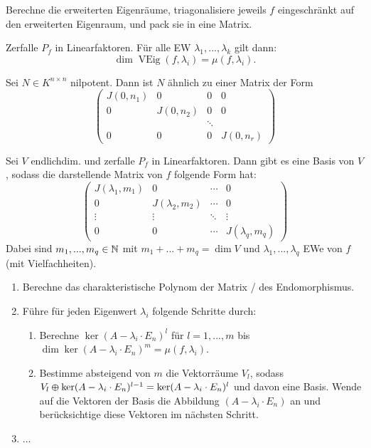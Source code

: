 \documentclass{cheat-sheet}
\DeclareMathOperator{\VEig}{VEig}
\begin{document}
\begin{verf}
  Berechne die erweiterten Eigenräume, triagonalisiere jeweils $f$ eingeschränkt auf den erweiterten Eigenraum, und pack sie in eine Matrix.
\end{verf}

\begin{satz}
  Zerfalle $P_f$ in Linearfaktoren. Für alle EW $\lambda_1, ..., \lambda_k$ gilt dann:
  \[ \dim \VEig(f, \lambda_i) = \mu(f, \lambda_i). \]
\end{satz}

\begin{satz}
  Sei $N \in K^{n \times n}$ nilpotent. Dann ist $N$ ähnlich zu einer Matrix der Form
  \[ \begin{pmatrix}
  J(0, n_1) & 0 & 0 & 0 \\
  0 & J(0, n_2) & 0 & 0 \\
  & & \ddots & \\
  0 & 0 & 0 & J(0, n_r)
  \end{pmatrix} \]
\end{satz}


\begin{satz}
  Sei $V$ endlichdim. und zerfalle $P_f$ in Linearfaktoren. Dann gibt es eine Basis von $V$, sodass die darstellende Matrix von $f$ folgende Form hat:
  \[ \begin{pmatrix}
  J(\lambda_1, m_1) & 0 & \cdots & 0 \\
  0 & J(\lambda_2, m_2) & \cdots & 0 \\
  \vdots & \vdots & \ddots & \vdots \\
  0 & 0 & \cdots & J(\lambda_q, m_q)
  \end{pmatrix} \]
  Dabei sind $m_1, ..., m_q \in \mathbb{N}$ mit $m_1 + ... + m_q = \dim V$ und $\lambda_1, ..., \lambda_q$ EWe von $f$ (mit Vielfachheiten).
\end{satz}


\begin{verf}[JNF]
  \begin{enumerate}
    \item Berechne das charakteristische Polynom der Matrix / des Endomorphismus.
    \item Führe für jeden Eigenwert $\lambda_i$ folgende Schritte durch:
    \begin{enumerate}
      \item Berechne $\ker (A - \lambda_i \cdot E_n)^l$ für $l = 1, ..., m$ bis $\dim \ker (A - \lambda_i \cdot E_n)^m = \mu(f, \lambda_i)$.
      \item Bestimme absteigend von $m$ die Vektorräume $V_l$, sodass $V_l \varoplus \ker (A - \lambda_i \cdot E_n)^{l-1} = \ker (A - \lambda_i \cdot E_n)^{l}$ und davon eine Basis. Wende auf die Vektoren der Basis die Abbildung $(A - \lambda_i \cdot E_n)$ an und berücksichtige diese Vektoren im nächsten Schritt.
    \end{enumerate}
    \item ...
  \end{enumerate}
\end{verf}
\end{document}
